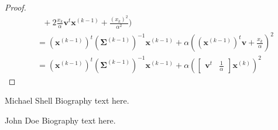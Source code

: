 \documentclass[journal,peerreview,onecolumn]{IEEEtran}
\begin{document}
\begin{proof}
\begin{align*}
                &~~~+ 2 \frac{x_k}{\alpha} \mathbf{v}^t \mathbf{x}^{(k-1)} + \frac{(x_k)^2}{\alpha^2}) \\
                &= (\mathbf{x}^{(k-1)})^t (\boldsymbol{\Sigma}^{(k-1)})^{-1} \mathbf{x}^{(k-1)} + \alpha ( (\mathbf{x}^{(k-1)})^t \mathbf{v} + \frac{x_k}{\alpha} )^2 \\
                &= (\mathbf{x}^{(k-1)})^t (\boldsymbol{\Sigma}^{(k-1)})^{-1} \mathbf{x}^{(k-1)} + \alpha ( \left[\begin{array}{cc} \mathbf{v}^t & \frac{1}{\alpha} \end{array}\right] \mathbf{x}^{(k)} )^2
            \end{align*}
        \end{proof}






%

\begin{IEEEbiography}{Michael Shell}
Biography text here.
\end{IEEEbiography}

\begin{IEEEbiographynophoto}{John Doe}
Biography text here.
\end{IEEEbiographynophoto}

\end{document}
